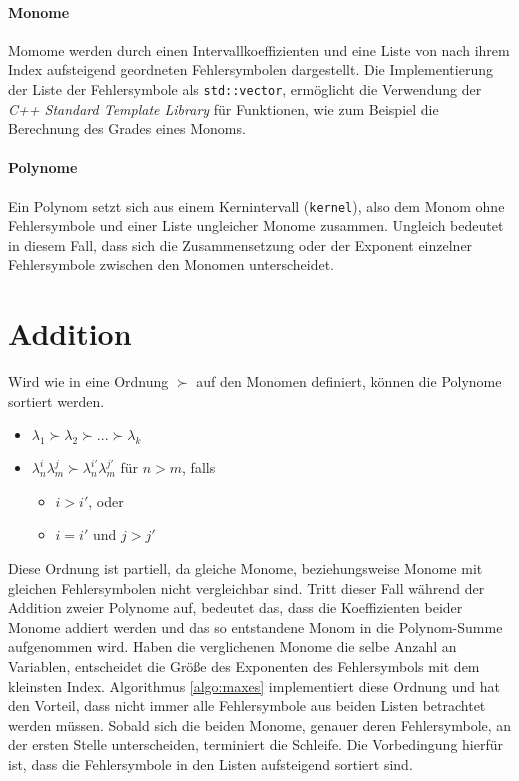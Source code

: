 \paragraph{Monome}
Momome werden durch einen Intervallkoeffizienten und eine Liste von nach ihrem Index aufsteigend geordneten Fehlersymbolen dargestellt. Die Implementierung der Liste der Fehlersymbole als \verb+std::vector+, ermöglicht die Verwendung der \textit{C++ Standard Template Library} für Funktionen, wie zum Beispiel die Berechnung des Grades eines Monoms.

\paragraph{Polynome}
Ein Polynom setzt sich aus einem Kernintervall (\verb+kernel+), also dem Monom ohne Fehlersymbole und einer Liste ungleicher Monome zusammen. Ungleich bedeutet in diesem Fall, dass sich die Zusammensetzung  oder der Exponent einzelner Fehlersymbole zwischen den Monomen unterscheidet.


\section{Addition}

Wird wie in \cite{geobuckets} eine Ordnung $\succ$ auf den Monomen definiert, können die Polynome sortiert werden.
\begin{itemize}
    \label{def:order}
    \item $\lambda_1 \succ \lambda_2 \succ...\succ \lambda_k $
    \item $\lambda_n^i \lambda_m^j \succ \lambda_n^{i'} \lambda_m^{j'} $ für $n > m$, falls
    \begin{itemize}
        \item[] $ i > i'$, oder
        \item[] $ i = i'$ und $ j > j'$
    \end{itemize}
\end{itemize}
Diese Ordnung ist partiell, da gleiche Monome, beziehungsweise Monome mit gleichen Fehlersymbolen nicht vergleichbar sind. Tritt dieser Fall während der Addition zweier Polynome auf, bedeutet das, dass die Koeffizienten beider Monome addiert werden und das so entstandene Monom in die Polynom-Summe aufgenommen wird.
Haben die verglichenen Monome die selbe Anzahl an Variablen, entscheidet die Größe des Exponenten des Fehlersymbols mit dem kleinsten Index. Algorithmus \ref{algo:maxes} implementiert diese Ordnung und hat den Vorteil, dass nicht immer alle Fehlersymbole aus beiden Listen betrachtet werden müssen. Sobald sich die beiden Monome, genauer deren Fehlersymbole, an der ersten Stelle unterscheiden, terminiert die Schleife. Die Vorbedingung hierfür ist, dass die Fehlersymbole in den Listen aufsteigend sortiert sind.



